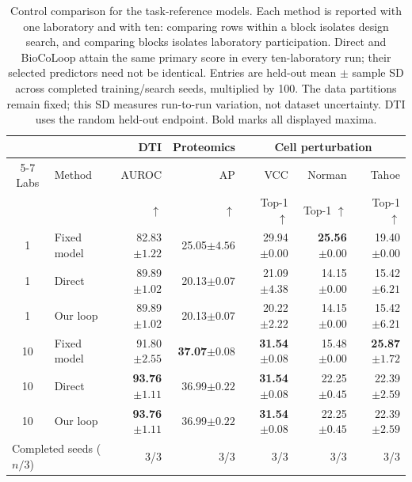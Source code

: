 \begin{table}[t]
\caption{Control comparison for the task-reference models. Each method is reported with one laboratory and with ten: comparing rows within a block isolates design search, and comparing blocks isolates laboratory participation. Direct and BioCoLoop attain the same primary score in every ten-laboratory run; their selected predictors need not be identical. Entries are held-out mean $\pm$ sample SD across completed training/search seeds, multiplied by 100. The data partitions remain fixed; this SD measures run-to-run variation, not dataset uncertainty. DTI uses the random held-out endpoint. Bold marks all displayed maxima.}
\label{tab:strong-ablation}
\centering\small
\setlength{\tabcolsep}{3pt}
\begin{tabular}{clrrrrr}
\toprule
 & & DTI & Proteomics & \multicolumn{3}{c}{Cell perturbation} \\
\cmidrule(lr){5-7}
Labs & Method & AUROC & AP & VCC & Norman & Tahoe \\
 & & $\uparrow$ & $\uparrow$ & Top-1 $\uparrow$ & Top-1 $\uparrow$ & Top-1 $\uparrow$ \\
\midrule
1 & Fixed model & 82.83{\scriptsize$\pm1.22$} & 25.05{\scriptsize$\pm4.56$} & 29.94{\scriptsize$\pm0.00$} & \textbf{25.56}{\scriptsize$\pm0.00$} & 19.40{\scriptsize$\pm0.00$} \\
1 & Direct & 89.89{\scriptsize$\pm1.02$} & 20.13{\scriptsize$\pm0.07$} & 21.09{\scriptsize$\pm4.38$} & 14.15{\scriptsize$\pm0.00$} & 15.42{\scriptsize$\pm6.21$} \\
1 & Our loop & 89.89{\scriptsize$\pm1.02$} & 20.13{\scriptsize$\pm0.07$} & 20.22{\scriptsize$\pm2.22$} & 14.15{\scriptsize$\pm0.00$} & 15.42{\scriptsize$\pm6.21$} \\
\midrule
10 & Fixed model & 91.80{\scriptsize$\pm2.55$} & \textbf{37.07}{\scriptsize$\pm0.08$} & \textbf{31.54}{\scriptsize$\pm0.08$} & 15.48{\scriptsize$\pm0.00$} & \textbf{25.87}{\scriptsize$\pm1.72$} \\
10 & Direct & \textbf{93.76}{\scriptsize$\pm1.11$} & 36.99{\scriptsize$\pm0.22$} & \textbf{31.54}{\scriptsize$\pm0.08$} & 22.25{\scriptsize$\pm0.45$} & 22.39{\scriptsize$\pm2.59$} \\
10 & Our loop & \textbf{93.76}{\scriptsize$\pm1.11$} & 36.99{\scriptsize$\pm0.22$} & \textbf{31.54}{\scriptsize$\pm0.08$} & 22.25{\scriptsize$\pm0.45$} & 22.39{\scriptsize$\pm2.59$} \\
\midrule
\multicolumn{2}{l}{Completed seeds ($n/3$)} & 3/3 & 3/3 & 3/3 & 3/3 & 3/3 \\
\bottomrule
\end{tabular}
\end{table}
